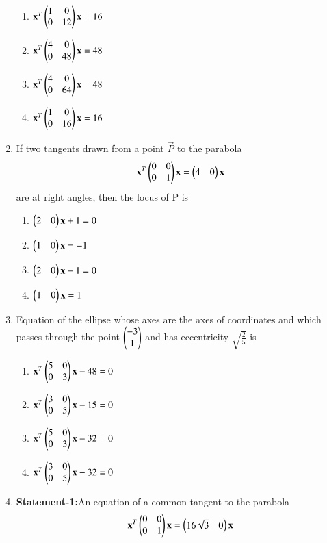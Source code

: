 \documentclass[journal,12pt,twocolumn]{IEEEtran}
\begin{document}
\begin{enumerate}[label=\arabic*]
    \begin{enumerate}
    \item $\mathbf{x}^T\begin{pmatrix}1&0\\0&12\end{pmatrix}\mathbf{x}=16$
    \item $\mathbf{x}^T\begin{pmatrix}4&0\\0&48\end{pmatrix}\mathbf{x}=48$ 
    \item $\mathbf{x}^T\begin{pmatrix}4&0\\0&64\end{pmatrix}\mathbf{x}=48$
    \item $\mathbf{x}^T\begin{pmatrix}1&0\\0&16\end{pmatrix}\mathbf{x}=16$ 
    \end{enumerate}
    \item If two tangents drawn from a point $\vec{P}$ to the parabola
    \begin{align}
    \mathbf{x}^T\begin{pmatrix}0&0\\0&1\end{pmatrix}\mathbf{x}=\begin{pmatrix}4&0\end{pmatrix}\mathbf{x}
    \end{align} are at right angles, then the locus of P is
    \begin{enumerate}
    \item $\begin{pmatrix}2&0\end{pmatrix}\mathbf{x}+1=0$
    \item $\begin{pmatrix}1&0\end{pmatrix}\mathbf{x}=-1$ 
    \item $\begin{pmatrix}2&0\end{pmatrix}\mathbf{x}-1=0$
    \item $\begin{pmatrix}1&0\end{pmatrix}\mathbf{x}=1$
    \end{enumerate}
    \item Equation of the ellipse whose axes are the axes of coordinates and which passes through the point $\begin{pmatrix}-3\\1\end{pmatrix}$ and has eccentricity $\sqrt{\frac{2}{5}}$ is
    \begin{enumerate}
    \item $\mathbf{x}^T\begin{pmatrix}5&0\\0&3\end{pmatrix}\mathbf{x}-48=0$
    \item $\mathbf{x}^T\begin{pmatrix}3&0\\0&5\end{pmatrix}\mathbf{x}-15=0$ 
    \item $\mathbf{x}^T\begin{pmatrix}5&0\\0&3\end{pmatrix}\mathbf{x}-32=0$
    \item $\mathbf{x}^T\begin{pmatrix}3&0\\0&5\end{pmatrix}\mathbf{x}-32=0$ 
    \end{enumerate}
    \item \textbf{Statement-1:}An equation of a common tangent to the parabola
    \begin{align}
    \vec{x}^T\myvec{0&0\\0&1}\vec{x}=\myvec{16\sqrt{3}&0}\vec{x} 

\end{align}
\end{enumerate}
\end{document}
